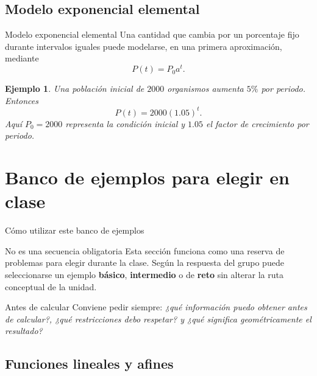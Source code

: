 \documentclass[aspectratio=169,10pt]{beamer}
\newtheorem{ejemplo}{Ejemplo}
\begin{document}
\subsection*{Modelo exponencial elemental}
\begin{frame}{Modelo exponencial elemental}
Una cantidad que cambia por un porcentaje fijo durante intervalos iguales puede
modelarse, en una primera aproximación, mediante
\[
P(t)=P_0a^t.
\]

\begin{ejemplo}
Una población inicial de $2000$ organismos aumenta $5\%$ por periodo. Entonces
\[
P(t)=2000(1.05)^t.
\]
Aquí $P_0=2000$ representa la condición inicial y $1.05$ el factor de
crecimiento por periodo.
\end{ejemplo}


\end{frame}
\section{Banco de ejemplos para elegir en clase}

\begin{frame}{Cómo utilizar este banco de ejemplos}
\begin{block}{No es una secuencia obligatoria}
Esta sección funciona como una reserva de problemas para elegir durante la clase. Según la respuesta del grupo puede seleccionarse un ejemplo \textbf{básico}, \textbf{intermedio} o de \textbf{reto} sin alterar la ruta conceptual de la unidad.
\end{block}
\begin{alertblock}{Antes de calcular}
Conviene pedir siempre: \emph{¿qué información puedo obtener antes de calcular?, ¿qué restricciones debo respetar? y ¿qué significa geométricamente el resultado?}
\end{alertblock}
\end{frame}

\subsection*{Funciones lineales y afines}
\end{document}
